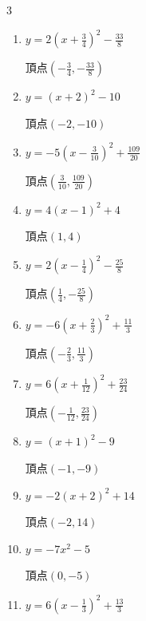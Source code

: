\begin{multicols}{3}
\begin{enumerate}
  \item $\displaystyle y=2\left( x+\frac{3}{4}\right)^{2}-\frac{33}{8}$

        $\displaystyle 頂点\left( -\frac{3}{4} , -\frac{33}{8} \right)$

  \item $\displaystyle y=\left( x+2\right)^{2}-10$

        $\displaystyle 頂点\left( -2 , -10 \right)$

  \item $\displaystyle y=-5\left( x-\frac{3}{10}\right)^{2}+\frac{109}{20}$

        $\displaystyle 頂点\left( \frac{3}{10} , \frac{109}{20} \right)$

  \item $\displaystyle y=4\left( x-1\right)^{2}+4$

        $\displaystyle 頂点\left( 1 , 4 \right)$

  \item $\displaystyle y=2\left( x-\frac{1}{4}\right)^{2}-\frac{25}{8}$

        $\displaystyle 頂点\left( \frac{1}{4} , -\frac{25}{8} \right)$

  \item $\displaystyle y=-6\left( x+\frac{2}{3}\right)^{2}+\frac{11}{3}$

        $\displaystyle 頂点\left( -\frac{2}{3} , \frac{11}{3} \right)$

  \item $\displaystyle y=6\left( x+\frac{1}{12}\right)^{2}+\frac{23}{24}$

        $\displaystyle 頂点\left( -\frac{1}{12} , \frac{23}{24} \right)$

  \item $\displaystyle y=\left( x+1\right)^{2}-9$

        $\displaystyle 頂点\left( -1 , -9 \right)$

  \item $\displaystyle y=-2\left( x+2\right)^{2}+14$

        $\displaystyle 頂点\left( -2 , 14 \right)$

  \item $\displaystyle y=-7x^{2}-5$

        $\displaystyle 頂点\left( 0 , -5 \right)$

\columnbreak %

  \item $\displaystyle y=6\left( x-\frac{1}{3}\right)^{2}+\frac{13}{3}$


\end{enumerate}
\end{multicols}
